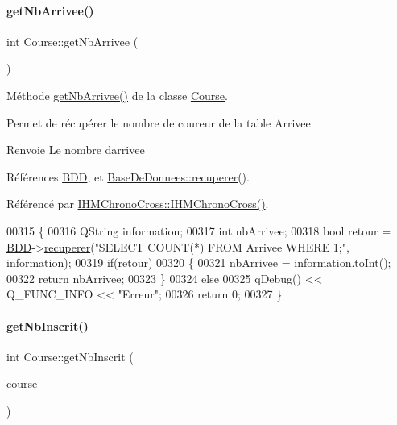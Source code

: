 \paragraph{\texorpdfstring{get\+Nb\+Arrivee()}{getNbArrivee()}}
{\footnotesize\ttfamily int Course\+::get\+Nb\+Arrivee (\begin{DoxyParamCaption}{ }\end{DoxyParamCaption})}



Méthode \hyperlink{class_course_ad8dd87e7f299bc938f40423f28c837e8}{get\+Nb\+Arrivee()} de la classe \hyperlink{class_course}{Course}. 

Permet de récupérer le nombre de coureur de la table Arrivee \begin{DoxyReturn}{Renvoie}
Le nombre d\textquotesingle{}arrivee 
\end{DoxyReturn}


Références \hyperlink{class_course_a28a58b06494361b7a7eb81844d571dd4}{B\+DD}, et \hyperlink{class_base_de_donnees_a77539baad389f5acf754cd2cd452403e}{Base\+De\+Donnees\+::recuperer()}.



Référencé par \hyperlink{class_i_h_m_chrono_cross_a479fc90733fba3e65fb06aa4a3adc02e}{I\+H\+M\+Chrono\+Cross\+::\+I\+H\+M\+Chrono\+Cross()}.


\begin{DoxyCode}
00315 \{
00316     QString information;
00317     \textcolor{keywordtype}{int} nbArrivee;
00318     \textcolor{keywordtype}{bool} retour = \hyperlink{class_course_a28a58b06494361b7a7eb81844d571dd4}{BDD}->\hyperlink{class_base_de_donnees_a77539baad389f5acf754cd2cd452403e}{recuperer}(\textcolor{stringliteral}{"SELECT COUNT(*) FROM Arrivee WHERE 1;"}, information);
00319     \textcolor{keywordflow}{if}(retour)
00320     \{
00321         nbArrivee = information.toInt();
00322         \textcolor{keywordflow}{return} nbArrivee;
00323     \}
00324     \textcolor{keywordflow}{else}
00325         qDebug() << Q\_FUNC\_INFO << \textcolor{stringliteral}{"Erreur"};
00326         \textcolor{keywordflow}{return} 0;
00327 \}
\end{DoxyCode}
\mbox{\label{class_course_ad0ff4153f1e02826d551f478f95ad260}} 
\paragraph{\texorpdfstring{get\+Nb\+Inscrit()}{getNbInscrit()}}
{\footnotesize\ttfamily int Course\+::get\+Nb\+Inscrit (\begin{DoxyParamCaption}\item[{Q\+String}]{course }\end{DoxyParamCaption})}



